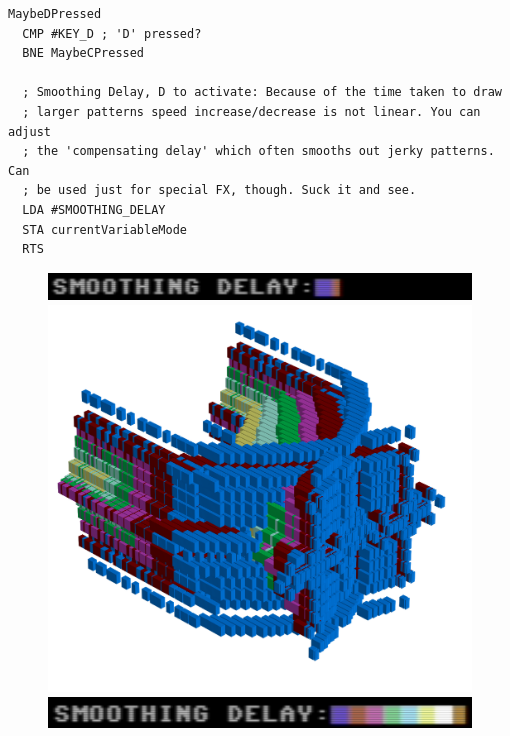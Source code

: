 \begin{lstlisting}[caption=From \icode{CheckKeyboardInput}.]
MaybeDPressed   
  CMP #KEY_D ; 'D' pressed?
  BNE MaybeCPressed

  ; Smoothing Delay, D to activate: Because of the time taken to draw
  ; larger patterns speed increase/decrease is not linear. You can adjust
  ; the 'compensating delay' which often smooths out jerky patterns. Can
  ; be used just for special FX, though. Suck it and see.
  LDA #SMOOTHING_DELAY
  STA currentVariableMode
  RTS 
\end{lstlisting}
\begin{figure}[H]
    \centering
    \begin{adjustbox}{width=3cm,margin=11cm -12cm}
      \includegraphics[width=12cm]{src/delay/delay-low.png}%
    \end{adjustbox}
    \begin{adjustbox}{width=10.5cm,center}
      \includegraphics[width=12cm]{src/delay/pattern0-45.png}%
    \end{adjustbox}
    \begin{adjustbox}{width=3cm,margin=11cm -12cm}
      \includegraphics[width=12cm]{src/delay/delay-high.png}%
    \end{adjustbox}

\end{figure}
